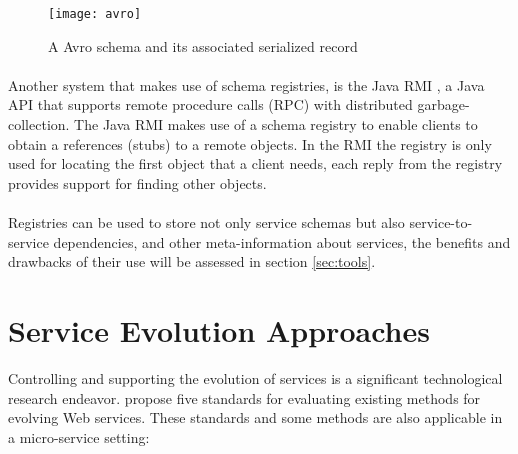 \begin{figure}[htbp]
    \centering
    \texttt{[image: avro]}
    \caption{A Avro schema and its associated serialized record }
    \label{fig:avro}
\end{figure}

\paragraph{}

Another system that makes use of schema registries, is the Java RMI \cite{12},
a Java API that supports remote procedure calls (RPC) with distributed garbage-collection.
The Java RMI makes use of a schema registry to enable clients to obtain a references (stubs) to a remote objects.
In the RMI the registry is only used for locating the first object that a client needs, each reply from the registry provides
support for finding other objects.

\paragraph{}

Registries can be used to store not only service schemas but also service-to-service dependencies, and other meta-information about services, the benefits and drawbacks of their use will be
assessed in section \ref{sec:tools}.

\section{Service Evolution Approaches} %
\label{sec:service_evolution_approaches}

Controlling and supporting the evolution of services is a significant technological research endeavor.
\citeauthor{webServiceEvolution} \cite{webServiceEvolution} propose five standards for evaluating existing methods for evolving Web services.
These standards and some methods are also applicable in a micro-service setting:

